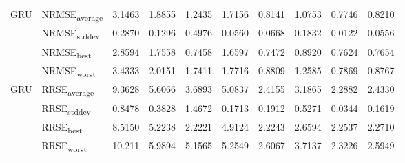 {\begin{longtable}{l l c c c c c c c c}
\cmidrule(lr){2-10}
\multirow{4}{*}{GRU} & NRMSE\textsubscript{average} & 3.1463 & 1.8855 & 1.2435 & 1.7156 & 0.8141 & 1.0753 & 0.7746 & 0.8210 \\
 & NRMSE\textsubscript{stddev} & 0.2870 & 0.1296 & 0.4976 & 0.0560 & 0.0668 & 0.1832 & 0.0122 & 0.0556 \\
 & NRMSE\textsubscript{best} & 2.8594 & 1.7558 & 0.7458 & 1.6597 & 0.7472 & 0.8920 & 0.7624 & 0.7654 \\
 & NRMSE\textsubscript{worst} & 3.4333 & 2.0151 & 1.7411 & 1.7716 & 0.8809 & 1.2585 & 0.7869 & 0.8767 \\
\cmidrule(lr){2-10}
\multirow{4}{*}{GRU} & RRSE\textsubscript{average} & 9.3628 & 5.6066 & 3.6893 & 5.0837 & 2.4155 & 3.1865 & 2.2882 & 2.4330 \\
 & RRSE\textsubscript{stddev} & 0.8478 & 0.3828 & 1.4672 & 0.1713 & 0.1912 & 0.5271 & 0.0344 & 0.1619 \\
 & RRSE\textsubscript{best} & 8.5150 & 5.2238 & 2.2221 & 4.9124 & 2.2243 & 2.6594 & 2.2537 & 2.2710 \\
 & RRSE\textsubscript{worst} & 10.211 & 5.9894 & 5.1565 & 5.2549 & 2.6067 & 3.7137 & 2.3226 & 2.5949 \\
\cmidrule(lr){2-10}
\end{longtable}
}